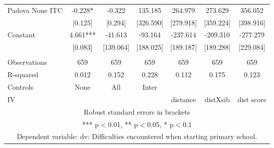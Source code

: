 \begin{tabular}{lcccccc}
Padova None ITC & -0.228* & -0.322 & 135.185 & 264.979 & 273.629 & 356.052 \\
 & [0.125] & [0.294] & [326.590] & [279.918] & [359.224] & [398.916] \\
Constant & 4.661*** & -41.613 & -93.164 & -237.614 & -209.310 & -277.279 \\
 & [0.083] & [139.064] & [188.025] & [189.187] & [189.288] & [229.084] \\
 &  &  &  &  &  &  \\
Observations & 659 & 659 & 659 & 659 & 659 & 659 \\
R-squared & 0.012 & 0.152 & 0.228 & 0.112 & 0.175 & 0.123 \\
Controls & None & All & Inter &  &  &  \\
 IV &  &  &  & distance & distXsib & dist score \\ \hline
\multicolumn{7}{c}{ Robust standard errors in brackets} \\
\multicolumn{7}{c}{ *** p$<$0.01, ** p$<$0.05, * p$<$0.1} \\
\multicolumn{7}{c}{ Dependent variable: dv: Difficulties encountered when starting primary school.} \\
\end{tabular}
